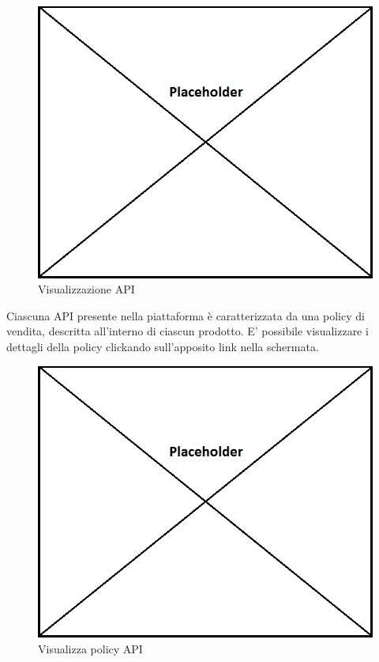 \label{Visualizzazione API}
\begin{figure}[H]
	\centering
	\includegraphics[scale=0.45]{img/placeholder.png}
	\caption{Visualizzazione API}
\end{figure}

Ciascuna API presente nella piattaforma è caratterizzata da una policy di vendita, descritta all'interno di ciascun prodotto. E' possibile visualizzare i dettagli della policy clickando sull'apposito link nella schermata.

\label{Visualizza policy API}
\begin{figure}[H]
	\centering
	\includegraphics[scale=0.45]{img/placeholder.png}
	\caption{Visualizza policy API}
\end{figure}

